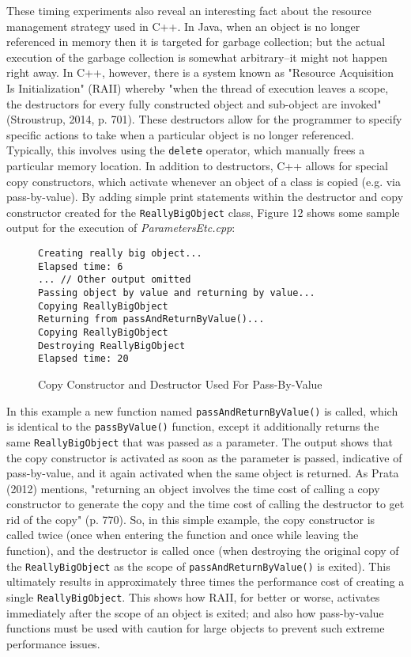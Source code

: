 \documentclass[11pt]{article}
\begin{document}
	These timing experiments also reveal an interesting fact about the resource management strategy used in C++.  In Java, when an object is no longer referenced in memory then it is targeted for garbage collection; but the actual execution of the garbage collection is somewhat arbitrary--it might not happen right away.  In C++, however, there is a system known as "Resource Acquisition Is Initialization" (RAII) whereby "when the thread of execution leaves a scope, the destructors for every fully constructed object and sub-object are invoked" (Stroustrup, 2014, p. 701).  These destructors allow for the programmer to specify specific actions to take when a particular object is no longer referenced.  Typically, this involves using the \texttt{delete} operator, which manually frees a particular memory location.  In addition to destructors, C++ allows for special copy constructors, which activate whenever an object of a class is copied (e.g. via pass-by-value).	By adding simple print statements within the destructor and copy constructor created for the \texttt{ReallyBigObject} class, Figure 12 shows some sample output for the execution of \textit{ParametersEtc.cpp}:

\begin{figure}[!h]
\centering
\begin{BVerbatim}
Creating really big object...
Elapsed time: 6
... // Other output omitted
Passing object by value and returning by value...
Copying ReallyBigObject
Returning from passAndReturnByValue()...
Copying ReallyBigObject
Destroying ReallyBigObject
Elapsed time: 20
\end{BVerbatim}
\caption{Copy Constructor and Destructor Used For Pass-By-Value}
\end{figure} \FloatBarrier

	In this example a new function named \texttt{passAndReturnByValue()} is called, which is identical to the \texttt{passByValue()} function, except it additionally returns the same \texttt{ReallyBigObject} that was passed as a parameter.  The output shows that the copy constructor is activated as soon as the parameter is passed, indicative of pass-by-value, and it again activated when the same object is returned.  As Prata (2012) mentions, "returning an object involves the time cost of calling a copy constructor to generate the copy and the time cost of calling the destructor to get rid of the copy" (p. 770).  So, in this simple example, the copy constructor is called twice (once when entering the function and once while leaving the function), and the destructor is called once (when destroying the original copy of the \texttt{ReallyBigObject} as the scope of \texttt{passAndReturnByValue()} is exited).  This ultimately results in approximately three times the performance cost of creating a single \texttt{ReallyBigObject}.  This shows how RAII, for better or worse, activates immediately after the scope of an object is exited; and also how pass-by-value functions must be used with caution for large objects to prevent such extreme performance issues.
\end{document}
